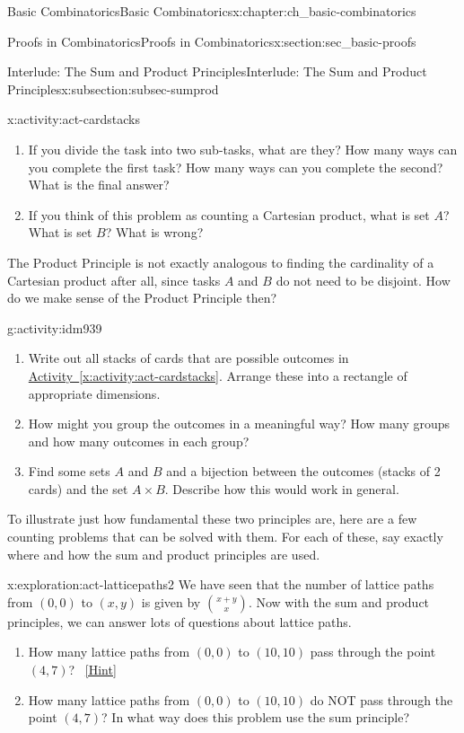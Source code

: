 \documentclass[oneside,10pt,]{book}
\numberwithin{equation}{chapter}
\begin{document}
\begin{chapterptx}{Basic Combinatorics}{}{Basic Combinatorics}{}{}{x:chapter:ch_basic-combinatorics}
\begin{sectionptx}{Proofs in Combinatorics}{}{Proofs in Combinatorics}{}{}{x:section:sec_basic-proofs}
\begin{subsectionptx}{Interlude: The Sum and Product Principles}{}{Interlude: The Sum and Product Principles}{}{}{x:subsection:subsec-sumprod}
\begin{activity}{}{x:activity:act-cardstacks}
\begin{enumerate}[font=\bfseries,label=(\alph*),ref=\alph*]
\item{}If you divide the task into two sub-tasks, what are they?  How many ways can you complete the first task?  How many ways can you complete the second?  What is the final answer?%
\item{}If you think of this problem as counting a Cartesian product, what is set \(A\)?  What is set \(B\)?  What is wrong?%
\end{enumerate}
\end{activity}
The Product Principle is not exactly analogous to finding the cardinality of a Cartesian product after all, since tasks \(A\) and \(B\) do not need to be disjoint.  How do we make sense of the Product Principle then?%
\begin{activity}{}{g:activity:idm939}%
\begin{enumerate}[font=\bfseries,label=(\alph*),ref=\alph*]
\item{}Write out all stacks of cards that are possible outcomes in \hyperref[x:activity:act-cardstacks]{Activity~\ref{x:activity:act-cardstacks}}.  Arrange these into a rectangle of appropriate dimensions.%
\item{}How might you group the outcomes in a meaningful way?  How many groups and how many outcomes in each group?%
\item{}Find some sets \(A\) and \(B\) and a bijection between the outcomes (stacks of 2 cards) and the set \(A \times B\).  Describe how this would work in general.%
\end{enumerate}
\end{activity}
To illustrate just how fundamental these two principles are, here are a few counting problems that can be solved with them.  For each of these, say exactly where and how the sum and product principles are used.%
\begin{exploration}{}{x:exploration:act-latticepaths2}%
We have seen that the number of lattice paths from \((0,0)\) to \((x,y)\) is given by \(\binom{x+y}{x}\).  Now with the sum and product principles, we can answer lots of questions about lattice paths.%
\begin{enumerate}[font=\bfseries,label=(\alph*),ref=\alph*]
\item{}How many lattice paths from \((0,0)\) to \((10,10)\) pass through the point \((4,7)\)?%
\qquad~\hfill{\tiny\hyperlink{g:hint:idm963-back}{[Hint]}}\item{}How many lattice paths from \((0,0)\) to \((10,10)\) do NOT pass through the point \((4,7)\)?  In what way does this problem use the sum principle?%

\end{enumerate}
\end{exploration}
\end{subsectionptx}
\end{sectionptx}
\end{chapterptx}
\end{document}

